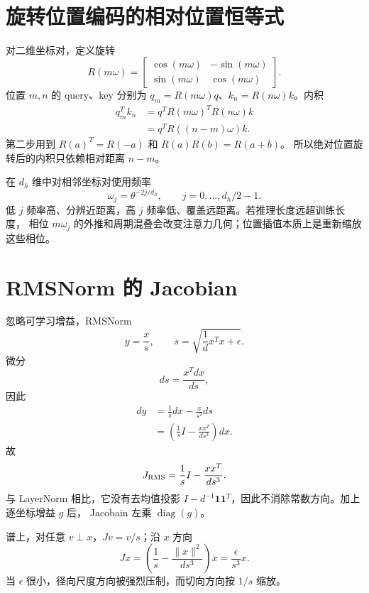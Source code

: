 \documentclass[11pt]{article}
\numberwithin{equation}{section}
\newcommand{\1}{\mathbf{1}}
\newcommand{\diag}{\operatorname{diag}}
\begin{document}
\section{旋转位置编码的相对位置恒等式}

对二维坐标对，定义旋转
\begin{equation}
 R(m\omega)=
 \begin{bmatrix}
 \cos(m\omega)&-\sin(m\omega)\\
 \sin(m\omega)&\cos(m\omega)
 \end{bmatrix}.
\end{equation}
位置 $m,n$ 的 query、key 分别为
$q_m=R(m\omega)q$、$k_n=R(n\omega)k$。内积
\begin{align}
 q_m^Tk_n
 &=q^TR(m\omega)^TR(n\omega)k\\
 &=q^TR((n-m)\omega)k.
\end{align}
第二步用到 $R(a)^T=R(-a)$ 和 $R(a)R(b)=R(a+b)$。
所以绝对位置旋转后的内积只依赖相对距离 $n-m$。

在 $d_h$ 维中对相邻坐标对使用频率
\begin{equation}
 \omega_j=\theta^{-2j/d_h},\qquad j=0,\ldots,d_h/2-1.
\end{equation}
低 $j$ 频率高、分辨近距离，高 $j$ 频率低、覆盖远距离。若推理长度远超训练长度，
相位 $m\omega_j$ 的外推和周期混叠会改变注意力几何；位置插值本质上是重新缩放这些相位。

\section{RMSNorm 的 Jacobian}

忽略可学习增益，RMSNorm
\begin{equation}
 y=\frac{x}{s},\qquad
 s=\sqrt{\frac1d x^Tx+\epsilon}.
\end{equation}
微分
\begin{equation}
 ds=\frac{x^Tdx}{d s},
\end{equation}
因此
\begin{align}
 dy&=\frac1s dx-\frac{x}{s^2}ds\\
 &=\left(\frac1sI-\frac{xx^T}{d s^3}\right)dx.
\end{align}
故
\begin{equation}
 J_{\rm RMS}=\frac1sI-\frac{xx^T}{d s^3}.
\end{equation}
与 LayerNorm 相比，它没有去均值投影
$I-d^{-1}\1\1^T$，因此不消除常数方向。加上逐坐标增益 $g$ 后，
Jacobain 左乘 $\diag(g)$。

谱上，对任意 $v\perp x$，$Jv=v/s$；沿 $x$ 方向
\begin{equation}
 Jx=\left(\frac1s-\frac{\|x\|^2}{d s^3}\right)x
 =\frac{\epsilon}{s^3}x.
\end{equation}
当 $\epsilon$ 很小，径向尺度方向被强烈压制，而切向方向按 $1/s$ 缩放。
\end{document}
